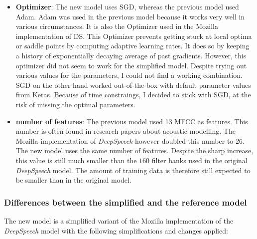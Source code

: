 \begin{itemize}
	\item \textbf{Optimizer}: The new model uses \ac{SGD}, whereas the previous model used Adam. Adam was used in the previous model because it works very well in various circumstances. It is also the Optimizer used in the Mozilla implementation of \ac{DS}. This Optimizer prevents getting stuck at local optima or saddle points by computing adaptive learning rates. It does so by keeping a history of exponentially decaying average of past gradients. However, this optimizer did not seem to work for the simplified model. Despite trying out various values for the parameters, I could not find a working combination. \ac{SGD} on the other hand worked out-of-the-box with default parameter values from Keras. Because of time constraings, I decided to stick with \ac{SGD}, at the risk of missing the optimal parameters.
	\item \textbf{number of features}: The previous model used 13 \ac{MFCC} as features. This number is often found in research papers about acoustic modelling. The Mozilla implementation of \textit{DeepSpeech} however doubled this number to $26$. The new model uses the same number of features. Despite the sharp increase, this value is still much smaller than the $160$ filter banks used in the original \textit{DeepSpeech} model. The amount of training data is therefore still expected to be smaller than in the original model.
\end{itemize}

\subsubsection{Differences between the simplified and the reference model}
The new model is a simplified variant of the Mozilla implementation of the \textit{DeepSpeech} model with the following simplifications and changes applied:

